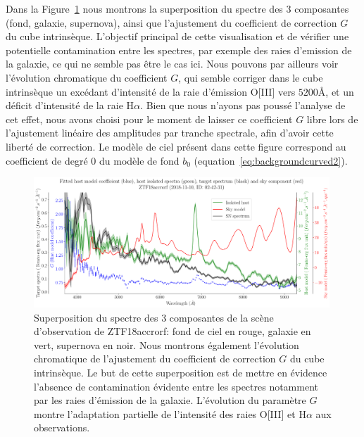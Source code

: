 \documentclass[../main/main.tex]{subfiles}
\begin{document}
Dans la Figure~\ref{fig:allsourcesZTF18accrorf} nous montrons la
superposition du spectre des 3 composantes (fond, galaxie, supernova),
ainsi que l'ajustement du coefficient de correction $G$ du cube
intrinsèque. L'objectif principal de cette visualisation et de vérifier
une potentielle contamination entre les spectres, par exemple des raies
d'emission de la galaxie, ce qui ne semble pas être le cas ici.
Nous pouvons par ailleurs voir l'évolution chromatique du coefficient $G$,
qui semble corriger dans le cube intrinsèque un excédant d'intensité de la raie d'émission O[III] vers
$5200$\AA, et un déficit d'intensité de la raie H$\alpha$. Bien que nous
n'ayons pas poussé l'analyse de cet effet, nous avons choisi pour le
moment de laisser ce coefficient $G$ libre lors de l'ajustement
linéaire des amplitudes par tranche spectrale, afin d'avoir cette
liberté de correction.
Le modèle de ciel présent dans cette figure correspond au coefficient
de degré $0$ du modèle de fond $b_{0}$ (equation~\ref{eq:backgroundcurved2}).

\begin{figure}
  \centering
  \includegraphics[width=0.99\textwidth]{../figures/07_scene/overlapped_component_ZTF18accrorf.pdf}
  \caption[Superposition du spectre des 3 composantes de la scène
  ZTF18accrorf.]{Superposition du spectre des 3 composantes de la scène d'observation de ZTF18accrorf: fond de
    ciel en rouge,
    galaxie en vert, supernova en noir.
    Nous montrons également l'évolution chromatique de l'ajustement du coefficient de correction $G$ du cube
    intrinsèque. Le but de cette superposition est de mettre en évidence
    l'absence de contamination évidente entre les spectres notamment par
    les raies d'émission de la galaxie. L'évolution du paramètre $G$
    montre l'adaptation partielle de l'intensité des raies O[III] et H$\alpha$ aux observations.}
  \label{fig:allsourcesZTF18accrorf}
\end{figure}
\end{document}
